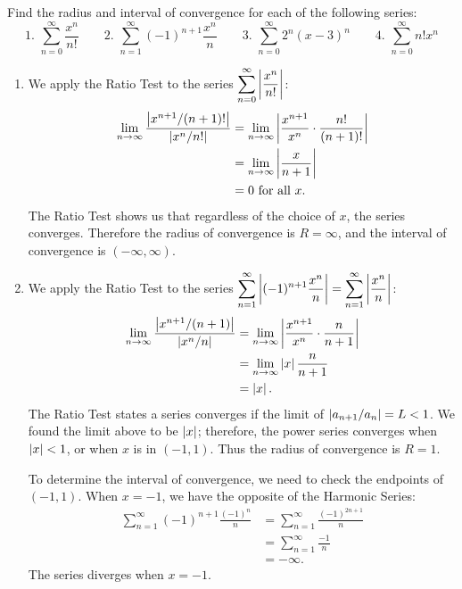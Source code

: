 \begin{example}\label{ex_ps2}%
Find the radius and interval of convergence for each of the following series:
\[
 \text{1. }\sum_{n=0}^\infty \frac{x^n}{n!} \qquad
 \text{2. }\sum_{n=1}^\infty (-1)^{n+1}\frac{x^n}{n}\qquad
 \text{3. }\sum_{n=0}^\infty 2^n(x-3)^n\qquad
 \text{4. }\sum_{n=0}^\infty n!x^n
\]
\solution
\begin{enumerate}
	\item We apply the Ratio Test to the series $\displaystyle \sum_{n=0}^\infty \left\lvert \frac{x^n}{n!} \right\rvert$:
		\begin{align*}
		\lim_{n\to\infty} \frac{\left\lvert x^{n+1}/(n+1)! \right\rvert}{\left\lvert x^n/n! \right\rvert} &= \lim_{n\to\infty} \left\lvert \frac{x^{n+1}}{x^n}\cdot\frac{n!}{(n+1)!} \right\rvert\\
			&= \lim_{n\to\infty} \left\lvert \frac x{n+1} \right\rvert\\
			&= 0 \text{ for all } x.
		\end{align*}
		The Ratio Test shows us that regardless of the choice of $x$, the series converges. Therefore the radius of convergence is $R=\infty$, and the interval of convergence is $(-\infty,\infty)$.
		
	\item		We apply the Ratio Test to the series $\displaystyle \sum_{n=1}^\infty \left\lvert (-1)^{n+1}\frac{x^n}{n} \right\rvert = \sum_{n=1}^\infty \left\lvert \frac{x^n}{n} \right\rvert$:
	\begin{align*}
	\lim_{n\to\infty} \frac{\left\lvert x^{n+1}/(n+1) \right\rvert}{\left\lvert x^n/n \right\rvert} &= \lim_{n\to\infty} \left\lvert \frac{x^{n+1}}{x^n}\cdot \frac{n}{n+1} \right\rvert \\
			&= \lim_{n\to\infty} \left\lvert x \right\rvert\frac{n}{n+1}\\
			&= \left\lvert x \right\rvert.
	\end{align*}
	The Ratio Test states a series converges if the limit of $\left\lvert a_{n+1}/a_n \right\rvert = L<1$. We found the limit above to be $\left\lvert x \right\rvert$; therefore, the power series converges when $\left\lvert x \right\rvert<1$, or when $x$ is in $(-1,1)$. Thus the radius of convergence is $R=1$.
	
	To determine the interval of convergence, we need to check the endpoints of $(-1,1)$. When $x=-1$, we have the opposite of the Harmonic Series:
	\begin{align*}
	\sum_{n=1}^\infty (-1)^{n+1}\frac{(-1)^n}{n}
	&= \sum_{n=1}^\infty \frac{(-1)^{2n+1}}{n}\\
	&= \sum_{n=1}^\infty \frac{-1}{n}\\
	&= -\infty.
	\end{align*}
	The series diverges when $x=-1$.
	

\end{enumerate}
\end{example}

